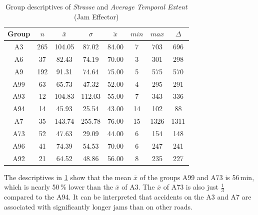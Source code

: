 \begin{table}[ht!]
	\tiny
	\centering
	\begin{tabular}{c|c|c|c|c|c|c|c}
		\toprule
		Group & $n$ & $\bar{x}$ & $\sigma$ & $\tilde{x}$ & $min$ & $max$ & $\Delta$ \\
		\midrule
		A3   & 265 & 104.05 & 87.02 & 84.00 & 7  & 703  & 696 \\ 
		A6   & 37  & 82.43  & 74.19  & 70.00 & 3  & 301  & 298 \\ 
		A9   & 192 & 91.31  & 74.64  & 75.00 & 5  & 575  & 570 \\  
		A99  & 63  & 65.73  & 47.32  & 52.00 & 4  & 295  & 291 \\ 
		A93  & 12  & 104.83 & 112.03 & 55.00 & 7  & 343  & 336 \\ 
		A94  & 14  & 45.93  & 25.54  & 43.00 & 14 & 102  & 88 \\ 
		A7   & 35  & 143.74 & 255.78 & 76.00 & 15 & 1326 & 1311 \\ 
		A73  & 52  & 47.63  & 29.09  & 44.00 & 6  & 154  & 148 \\ 
		A96  & 41  & 74.39  & 54.53  & 70.00 & 6  & 247  & 241 \\ 
		A92  & 21  & 64.52  & 48.86  & 56.00 & 8  & 235  & 227 \\ 
		\bottomrule
	  \end{tabular}
    \caption{Group descriptives of \textit{Strasse} and \textit{Average Temporal Extent} (Jam Effector)}
    \label{tbl:descriptives_baysis_effector_Strasse_TAvg}
\end{table}
The descriptives in \cref{tbl:descriptives_baysis_effector_Strasse_TAvg} show that the mean $\bar{x}$ of the groups A99 and A73 is 56\,min, which is nearly 50\,\% lower than the $\bar{x}$ of A3. The $\bar{x}$ of A73 is also just $\frac{1}{3}$ compared to the A94. It can be interpreted that accidents on the A3 and A7 are associated with significantly longer jams than on other roads.

